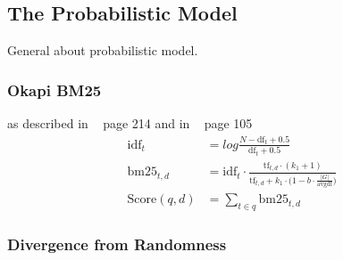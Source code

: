 \subsection{The Probabilistic Model}
\label{sec:the_probabilistic_model}

General about probabilistic model.

\subsubsection{Okapi BM25}
\label{sec:okapi_bm25}
as described in ~\cite{manning2008} page 214 and in ~\cite{ModernInvormationRetrieval1999} page 105
\begin{equation}
  \begin{split}
    \text{idf}_t & = log \frac{N - \text{df}_t + 0.5}{\text{df}_t + 0.5} \\
    \text{bm25}_{t, d} & = \text{idf}_t \cdot \frac{\text{tf}_{t, d} \cdot (k_1 + 1)}{\text{tf}_{t, d} + k_1 \cdot \bigl(1 - b \cdot \frac{|G|}{\text{avgdl}}\bigr)}  \\
    \text{Score}(q, d) & = \sum_{t \in q}\text{bm25}_{t, d}
  \end{split}
\end{equation}


\subsubsection{Divergence from Randomness}
\label{sec:divergence_from_randomness}

